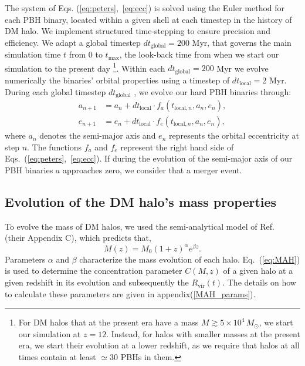 \documentclass[aps, prd, reprint, nofootinbib]{revtex4-2}
\begin{document}
The system of Eqs. (\ref{eq:peters},~\ref{eq:ecc}) is solved using the Euler method for each PBH
binary,
located within a given shell at each timestep in the history of DM halo. 
We implement structured time-stepping to ensure precision and efficiency. We adapt a global timestep $ dt_{\textrm{global}} = 200 $ Myr, that governs the main simulation time $t$ from 0 to $t_{\textrm{max}}$, the look-back time from when we start our simulation to the present day 
\footnote{For DM halos that at the present era have a mass 
$M \gtrsim 5 \times 10^{4} \, M_{\odot}$, we start our simulation at $z=12$. Instead, for halos with smaller masses at the present era, we start their evolution at a lower redshift, as we require that halos at all times contain at least $\simeq 30$ PBHs in them.}.  Within each $dt_{\textrm{global}} = 200$ Myr we evolve numerically the
binaries' orbital properties using a timestep of $ dt_{\textrm{local}} =2$ Myr.  
During each global timestep $ dt_{\textrm{global}}$ , we evolve our hard PBH binaries through:
\begin{eqnarray}
    a_{n+1} &= a_n + dt_{\textrm{local}} \cdot f_a(t_{\textrm{local}, n}, a_n, e_n), \\
    e_{n+1} &= e_n + dt_{\textrm{local}} \cdot f_e(t_{\textrm{local}, n}, a_n, e_n),
\end{eqnarray}
where $ a_n $ denotes the semi-major axis and $ e_n $ represents the orbital eccentricity at step $n$. The functions $ f_a $ and $ f_e $ represent the right hand side of Eqs.~(\ref{eq:peters},~\ref{eq:ecc}). 
If during the evolution of the semi-major axis of our PBH binaries $a$ approaches zero, we consider that a merger event. 

\subsection{Evolution of the DM halo's mass properties}

To evolve the mass of DM halos, we used the semi-analytical model of Ref.~\cite{MAH} (their Appendix C), which predicts that,
\begin{equation}
 M(z) = M_0 (1+z)^\alpha e^{\beta z}. 
 \label{eq:MAH}
\end{equation}
Parameters $\alpha$ and $\beta$ characterize the mass evolution of each halo. 
Eq.~(\ref{eq:MAH}) is used to determine the concentration parameter $C(M, z)$ of a given halo at a given redshift in its evolution and subsequently the $R_{\textrm{vir}}(t)$. The details on how to calculate these parameters are given in appendix(\ref{MAH_params}). 
\end{document}
